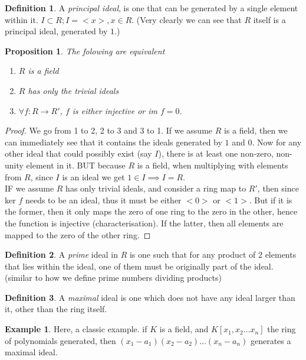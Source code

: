 \documentclass[12pt]{book}
\newtheorem{proposition}{Proposition}[section]
\theoremstyle{definition}
\newtheorem*{definition}{Definition}
\newtheorem{example}{Example}[chapter]
\begin{document}
\begin{definition}
    A \textit{principal ideal}, is one that can be generated by a single element within it. $I \subset R; I = <x>, x \in R$. (Very clearly we can see that $R$ itself is a principal ideal, generated by $1$.)
\end{definition}
\begin{proposition}
    The folowing are equivalent \begin{enumerate}
        \item $R$ is a field
        \item $R$ has only the trivial ideals
        \item $\forall f: R \to R'$, $f$ is either injective or im $f = 0$.
    \end{enumerate}
\end{proposition}
\begin{proof}
    We go from 1 to 2, 2 to 3 and 3 to 1.
    If we assume $R$ is a field, then we can immediately see that it contains the ideals generated by $1$ and $0$. Now for any other ideal that could possibly exist (say $I$), there is at least one non-zero, non-unity element in it. BUT because $R$ is a field, when multiplying with elements from $R$, since $I$ is an ideal we get $1 \in I \implies I = R$.\\
    IF we assume $R$ has only trivial ideals, and consider a ring map to $R'$, then since ker $f$ needs to be an ideal, thus it must be either $<0>$ or $<1>$. But if it is the former, then it only maps the zero of one ring to the zero in the other, hence the function is injective (characterisation). If the latter, then all elements are mapped to the zero of the other ring.
\end{proof}
\begin{definition}
    A \textit{prime} ideal in $R$ is one such that for any product of 2 elements that lies within the ideal, one of them must be originally part of the ideal. (similar to how we define prime numbers dividing products)
\end{definition}
\begin{definition}
    A \textit{maximal} ideal is one which does not have any ideal larger than it, other than the ring itself. 
\end{definition}
\begin{example}
    Here, a classic example. if $K$ is a field, and $K[x_1, x_2 \ldots x_n]$ the ring of polynomials generated, then $(x_1 - a_1)(x_2 - a_2)\ldots(x_n - a_n)$ generates a maximal ideal.
\end{example}
\end{document}

